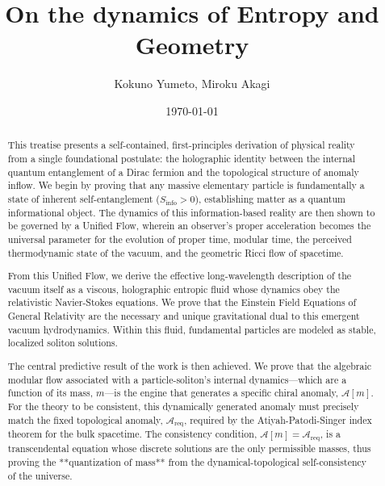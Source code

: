 \documentclass[11pt, letterpaper]{report}
\theoremstyle{plain} %
\theoremstyle{definition} %
\theoremstyle{remark} %
\begin{document}
\title{\textbf{On the dynamics of Entropy and Geometry}}
\author{Kokuno Yumeto,  Miroku Akagi}
\date{\today}
\maketitle



\begin{abstract}
This treatise presents a self-contained, first-principles derivation of physical reality from a single foundational postulate: the holographic identity between the internal quantum entanglement of a Dirac fermion and the topological structure of anomaly inflow. We begin by proving that any massive elementary particle is fundamentally a state of inherent self-entanglement ($S_{\text{info}}>0$), establishing matter as a quantum informational object. The dynamics of this information-based reality are then shown to be governed by a Unified Flow, wherein an observer's proper acceleration becomes the universal parameter for the evolution of proper time, modular time, the perceived thermodynamic state of the vacuum, and the geometric Ricci flow of spacetime.

From this Unified Flow, we derive the effective long-wavelength description of the vacuum itself as a viscous, holographic entropic fluid whose dynamics obey the relativistic Navier-Stokes equations. We prove that the Einstein Field Equations of General Relativity are the necessary and unique gravitational dual to this emergent vacuum hydrodynamics. Within this fluid, fundamental particles are modeled as stable, localized soliton solutions.

The central predictive result of the work is then achieved. We prove that the algebraic modular flow associated with a particle-soliton's internal dynamics—which are a function of its mass, $m$—is the engine that generates a specific chiral anomaly, $\mathcal{A}[m]$. For the theory to be consistent, this dynamically generated anomaly must precisely match the fixed topological anomaly, $\mathcal{A}_{\text{req}}$, required by the Atiyah-Patodi-Singer index theorem for the bulk spacetime. The consistency condition, $\mathcal{A}[m] = \mathcal{A}_{\text{req}}$, is a transcendental equation whose discrete solutions are the only permissible masses, thus proving the **quantization of mass** from the dynamical-topological self-consistency of the universe.


\end{abstract}
\end{document}
